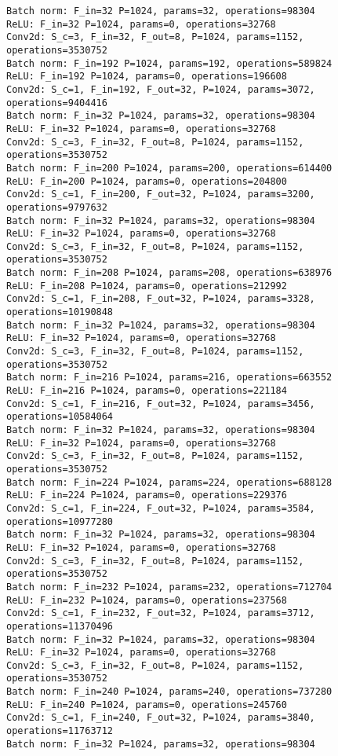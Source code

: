 \begin{Verbatim}[fontsize=\small]
Batch norm: F_in=32 P=1024, params=32, operations=98304
ReLU: F_in=32 P=1024, params=0, operations=32768
Conv2d: S_c=3, F_in=32, F_out=8, P=1024, params=1152, operations=3530752
Batch norm: F_in=192 P=1024, params=192, operations=589824
ReLU: F_in=192 P=1024, params=0, operations=196608
Conv2d: S_c=1, F_in=192, F_out=32, P=1024, params=3072, operations=9404416
Batch norm: F_in=32 P=1024, params=32, operations=98304
ReLU: F_in=32 P=1024, params=0, operations=32768
Conv2d: S_c=3, F_in=32, F_out=8, P=1024, params=1152, operations=3530752
Batch norm: F_in=200 P=1024, params=200, operations=614400
ReLU: F_in=200 P=1024, params=0, operations=204800
Conv2d: S_c=1, F_in=200, F_out=32, P=1024, params=3200, operations=9797632
Batch norm: F_in=32 P=1024, params=32, operations=98304
ReLU: F_in=32 P=1024, params=0, operations=32768
Conv2d: S_c=3, F_in=32, F_out=8, P=1024, params=1152, operations=3530752
Batch norm: F_in=208 P=1024, params=208, operations=638976
ReLU: F_in=208 P=1024, params=0, operations=212992
Conv2d: S_c=1, F_in=208, F_out=32, P=1024, params=3328, operations=10190848
Batch norm: F_in=32 P=1024, params=32, operations=98304
ReLU: F_in=32 P=1024, params=0, operations=32768
Conv2d: S_c=3, F_in=32, F_out=8, P=1024, params=1152, operations=3530752
Batch norm: F_in=216 P=1024, params=216, operations=663552
ReLU: F_in=216 P=1024, params=0, operations=221184
Conv2d: S_c=1, F_in=216, F_out=32, P=1024, params=3456, operations=10584064
Batch norm: F_in=32 P=1024, params=32, operations=98304
ReLU: F_in=32 P=1024, params=0, operations=32768
Conv2d: S_c=3, F_in=32, F_out=8, P=1024, params=1152, operations=3530752
Batch norm: F_in=224 P=1024, params=224, operations=688128
ReLU: F_in=224 P=1024, params=0, operations=229376
Conv2d: S_c=1, F_in=224, F_out=32, P=1024, params=3584, operations=10977280
Batch norm: F_in=32 P=1024, params=32, operations=98304
ReLU: F_in=32 P=1024, params=0, operations=32768
Conv2d: S_c=3, F_in=32, F_out=8, P=1024, params=1152, operations=3530752
Batch norm: F_in=232 P=1024, params=232, operations=712704
ReLU: F_in=232 P=1024, params=0, operations=237568
Conv2d: S_c=1, F_in=232, F_out=32, P=1024, params=3712, operations=11370496
Batch norm: F_in=32 P=1024, params=32, operations=98304
ReLU: F_in=32 P=1024, params=0, operations=32768
Conv2d: S_c=3, F_in=32, F_out=8, P=1024, params=1152, operations=3530752
Batch norm: F_in=240 P=1024, params=240, operations=737280
ReLU: F_in=240 P=1024, params=0, operations=245760
Conv2d: S_c=1, F_in=240, F_out=32, P=1024, params=3840, operations=11763712
Batch norm: F_in=32 P=1024, params=32, operations=98304

\end{Verbatim}
